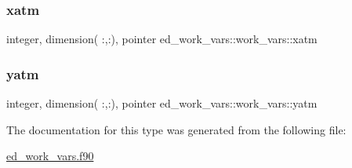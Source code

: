 \subsubsection{\texorpdfstring{xatm}{xatm}}
{\footnotesize\ttfamily integer, dimension(  \+:,\+:), pointer ed\+\_\+work\+\_\+vars\+::work\+\_\+vars\+::xatm}

\mbox{\label{structed__work__vars_1_1work__vars_a17db94cc26abac456241876d895a87b4}} 
\subsubsection{\texorpdfstring{yatm}{yatm}}
{\footnotesize\ttfamily integer, dimension(  \+:,\+:), pointer ed\+\_\+work\+\_\+vars\+::work\+\_\+vars\+::yatm}



The documentation for this type was generated from the following file\+:\begin{DoxyCompactItemize}
\item 
\hyperlink{ed__work__vars_8f90}{ed\+\_\+work\+\_\+vars.\+f90}\end{DoxyCompactItemize}
